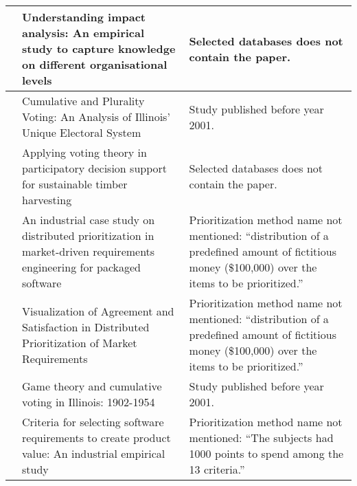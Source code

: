 {\begin{tabular}{
|>{\raggedright}p{}
|>{\raggedright}p{}
|>{\raggedright}p{}
|}
\citet{Jonsson2005a} & Understanding impact analysis: An empirical study to capture knowledge on different organisational levels &
Selected databases does not contain the paper.
\tabularnewline \hline

\citet{Kuklinski1973} & Cumulative and Plurality Voting: An Analysis of Illinois' Unique Electoral System &
Study published before year 2001.
\tabularnewline \hline

\citet{Laukkanen2004} & Applying voting theory in participatory decision support for sustainable timber harvesting &
Selected databases does not contain the paper.
\tabularnewline \hline

\citet{Regnell2001} & An industrial case study on distributed prioritization in market-driven requirements engineering for packaged software &
Prioritization method name not mentioned: ``distribution of a predefined amount of fictitious money (\$100,000) over the items to be prioritized.''
\tabularnewline \hline

\citet{Regnell2000} & Visualization of Agreement and Satisfaction in Distributed Prioritization of Market Requirements &
Prioritization method name not mentioned: ``distribution of a predefined amount of fictitious money (\$100,000) over the items to be prioritized.''
\tabularnewline \hline

\citet{Sawyer1962} & Game theory and cumulative voting in Illinois: 1902-1954 &
Study published before year 2001.
\tabularnewline \hline

\citet{Wohlin2006} & Criteria for selecting software requirements to create product value: An industrial empirical study &
Prioritization method name not mentioned: ``The subjects had 1000 points to spend among the 13 criteria.''
\tabularnewline \hline

\end{tabular}
}
